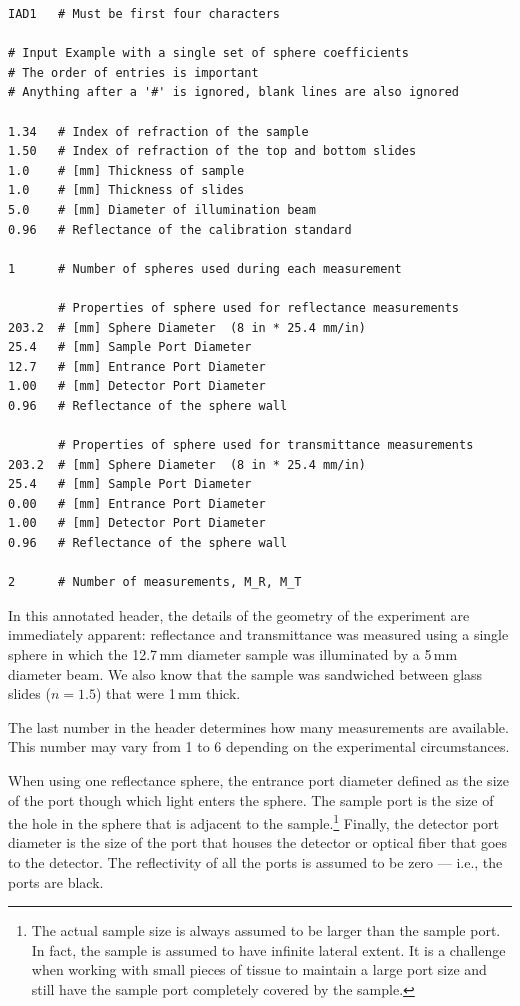 \documentclass{article}
\begin{document}
\begin{center}
\begin{minipage}{8cm}
\scriptsize
\begin{verbatim}
IAD1   # Must be first four characters

# Input Example with a single set of sphere coefficients
# The order of entries is important 
# Anything after a '#' is ignored, blank lines are also ignored
 
1.34   # Index of refraction of the sample
1.50   # Index of refraction of the top and bottom slides
1.0    # [mm] Thickness of sample
1.0    # [mm] Thickness of slides
5.0    # [mm] Diameter of illumination beam
0.96   # Reflectance of the calibration standard

1      # Number of spheres used during each measurement

       # Properties of sphere used for reflectance measurements
203.2  # [mm] Sphere Diameter  (8 in * 25.4 mm/in)
25.4   # [mm] Sample Port Diameter
12.7   # [mm] Entrance Port Diameter
1.00   # [mm] Detector Port Diameter
0.96   # Reflectance of the sphere wall

       # Properties of sphere used for transmittance measurements
203.2  # [mm] Sphere Diameter  (8 in * 25.4 mm/in)
25.4   # [mm] Sample Port Diameter
0.00   # [mm] Entrance Port Diameter
1.00   # [mm] Detector Port Diameter
0.96   # Reflectance of the sphere wall

2      # Number of measurements, M_R, M_T
\end{verbatim}
\end{minipage}
\end{center}
In this annotated header, the details of the
geometry of the experiment are immediately apparent: reflectance
and transmittance was measured using a single sphere in which 
the 12.7\,mm diameter sample was illuminated by a 5\,mm diameter beam.
We also know that the sample was sandwiched between glass slides
($n=1.5$) that were 1\,mm thick.

The last number in the header determines how many measurements are available.  This number may vary from 1 to 6 depending on the experimental circumstances.  

When using one reflectance sphere, the entrance port diameter defined as the size of the
port though which light enters the sphere.  The sample port is the size of the hole
in the sphere that is adjacent to the sample.\footnote[1]{The actual sample size is
always assumed to be larger than the sample port.  In fact, the sample is assumed
to have infinite lateral extent.  It is a challenge when working with small pieces
of tissue to maintain a large port size and still have the sample port completely
covered by the sample.}  Finally, the detector port diameter
is the size of the port that houses the detector or optical fiber that goes to the
detector.  The reflectivity of all the ports is assumed to be zero --- i.e., the 
ports are black.
\end{document}
